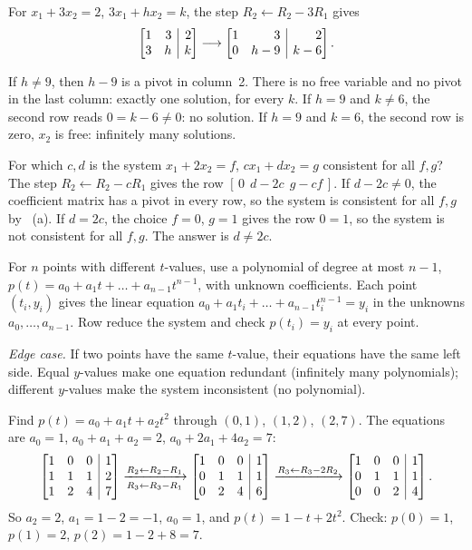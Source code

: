 \documentclass[10pt]{scrartcl}
\makeatletter
\newcommand{\aug}[2]{\left[\begin{array}{@{}#1@{}}#2\end{array}\right]}
\makeatother
\begin{document}
\begin{example*}
For $x_1+3x_2=2$, $3x_1+hx_2=k$, the step $R_2\leftarrow R_2-3R_1$ gives
\[
  \aug{rr|r}{1&3&2\\3&h&k}\longrightarrow\aug{rr|r}{1&3&2\\0&h-9&k-6}.
\]
\begin{itemize}
  \ii If $h\ne9$, then $h-9$ is a pivot in column~2. There is no free variable and no pivot in the last column: exactly one solution, for every $k$.
  \ii If $h=9$ and $k\ne6$, the second row reads $0=k-6\ne0$: no solution.
  \ii If $h=9$ and $k=6$, the second row is zero, $x_2$ is free: infinitely many solutions.
\end{itemize}
\end{example*}

\begin{example*}
For which $c,d$ is the system $x_1+2x_2=f$, $cx_1+dx_2=g$ consistent for all $f,g$? The step $R_2\leftarrow R_2-cR_1$ gives the row $[\,0\ \ d-2c\ \ g-cf\,]$. If $d-2c\ne0$, the coefficient matrix has a pivot in every row, so the system is consistent for all $f,g$ by ~(a). If $d=2c$, the choice $f=0$, $g=1$ gives the row $0=1$, so the system is not consistent for all $f,g$. The answer is $d\ne2c$.
\end{example*}

\begin{steps}
  \ii For $n$ points with different $t$-values, use a polynomial of degree at most $n-1$, $p(t)=a_0+a_1t+\dots+a_{n-1}t^{n-1}$, with unknown coefficients.
  \ii Each point $(t_i,y_i)$ gives the linear equation $a_0+a_1t_i+\dots+a_{n-1}t_i^{n-1}=y_i$ in the unknowns $a_0,\dots,a_{n-1}$.
  \ii Row reduce the system and check $p(t_i)=y_i$ at every point.
\end{steps}
\emph{Edge case.} If two points have the same $t$-value, their equations have the same left side. Equal $y$-values make one equation redundant (infinitely many polynomials); different $y$-values make the system inconsistent (no polynomial).

\begin{example*}
Find $p(t)=a_0+a_1t+a_2t^2$ through $(0,1)$, $(1,2)$, $(2,7)$. The equations are $a_0=1$, $a_0+a_1+a_2=2$, $a_0+2a_1+4a_2=7$:
\[
  \aug{rrr|r}{1&0&0&1\\1&1&1&2\\1&2&4&7}
  \xrightarrow[R_3\leftarrow R_3-R_1]{R_2\leftarrow R_2-R_1}
  \aug{rrr|r}{1&0&0&1\\0&1&1&1\\0&2&4&6}
  \xrightarrow{R_3\leftarrow R_3-2R_2}
  \aug{rrr|r}{1&0&0&1\\0&1&1&1\\0&0&2&4}.
\]
So $a_2=2$, $a_1=1-2=-1$, $a_0=1$, and $p(t)=1-t+2t^2$. Check: $p(0)=1$, $p(1)=2$, $p(2)=1-2+8=7$.
\end{example*}
\end{document}
